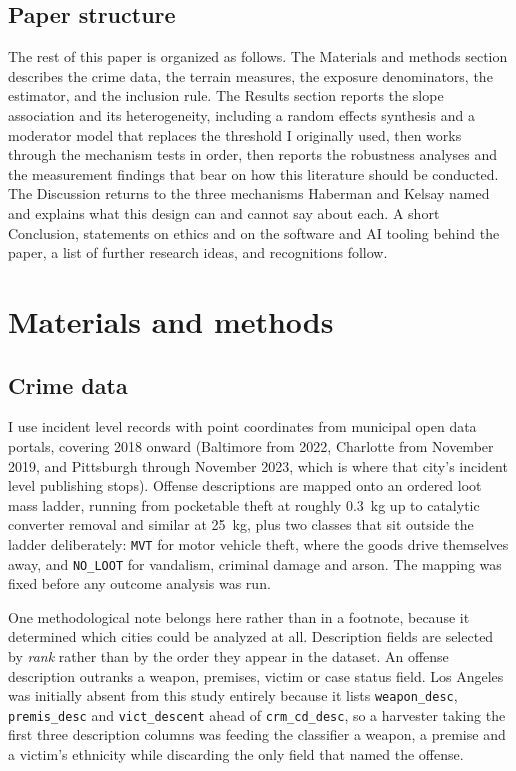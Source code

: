 \documentclass[10pt,letterpaper]{article}
\begin{document}
\subsection*{Paper structure}

The rest of this paper is organized as follows. The Materials and methods section
describes the crime data, the terrain measures, the exposure denominators, the
estimator, and the inclusion rule. The Results section reports the slope association
and its heterogeneity, including a random effects synthesis and a moderator model
that replaces the threshold I originally used, then works through the mechanism
tests in order, then reports the robustness analyses and the measurement findings
that bear on how this literature should be conducted. The Discussion returns to the
three mechanisms Haberman and Kelsay named and explains what this design can and
cannot say about each. A short Conclusion, statements on ethics and on the software
and AI tooling behind the paper, a list of further research ideas, and recognitions
follow.

\section*{Materials and methods}

\subsection*{Crime data}

I use incident level records with point coordinates from municipal open data portals,
covering 2018 onward (Baltimore from 2022, Charlotte from November 2019, and
Pittsburgh through November 2023, which is where that city's incident level
publishing stops). Offense descriptions are mapped onto an ordered loot mass ladder,
running from pocketable theft at roughly 0.3~kg up to catalytic converter removal and
similar at 25~kg, plus two classes that sit outside the ladder deliberately:
\texttt{MVT} for motor vehicle theft, where the goods drive themselves away, and
\texttt{NO\_LOOT} for vandalism, criminal damage and arson. The mapping was fixed
before any outcome analysis was run.

One methodological note belongs here rather than in a footnote, because it determined
which cities could be analyzed at all. Description fields are selected by \emph{rank}
rather than by the order they appear in the dataset. An offense description outranks
a weapon, premises, victim or case status field. Los Angeles was initially absent from
this study entirely because it lists \texttt{weapon\_desc}, \texttt{premis\_desc} and
\texttt{vict\_descent} ahead of \texttt{crm\_cd\_desc}, so a harvester taking the
first three description columns was feeding the classifier a weapon, a premise and a
victim's ethnicity while discarding the only field that named the offense.
\end{document}
